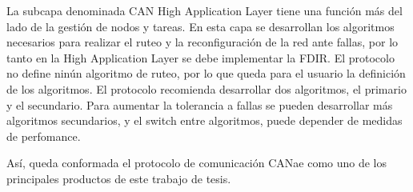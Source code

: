 La subcapa denominada CAN High Application Layer tiene una función más del lado de la gestión de nodos y tareas.
En esta capa se desarrollan los algoritmos necesarios para realizar el ruteo y la reconfiguración de la red ante
fallas, por lo tanto en la High Application Layer se debe implementar la FDIR. El protocolo no define ninún
algoritmo de ruteo, por lo que queda para el usuario la definición de los algoritmos.
El protocolo  recomienda desarrollar dos algoritmos, el primario y el secundario.
Para aumentar la tolerancia a fallas se pueden desarrollar más algoritmos
secundarios, y el switch entre algoritmos, puede depender de medidas de perfomance.

Así, queda conformada el protocolo de comunicación CANae como uno de los
principales productos de este trabajo de tesis. 
